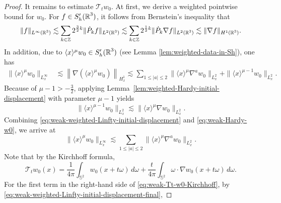 \documentclass[11pt,twoside]{article}
\def\Z{\mathop{\mathbb Z\kern 0pt}\nolimits}
\def\R{\mathop{\mathbb R\kern 0pt}\nolimits}
\def\f{\frac}
\def\ls{\lesssim}
\newcommand{\w}[1]{\langle {#1} \rangle}
\newcommand{\pk}{\dot{P}_k}
\theoremstyle{plain}
\theoremstyle{definition}
\theoremstyle{assumption}
\numberwithin{equation}{section}
\begin{document}
\begin{proof}
				It remains to estimate \(\mathcal T_t w_0\). At first, we derive a weighted pointwise
				bound for $w_0$. For $f\in S'_h(\R^3)$, it follows from Bernstein's inequality that
				\begin{equation}\label{ineq:homogeneous-Sobolev-inequality}
					\|f\|_{L^\infty(\R^3)}
					\ls
					\sum_{k\in\Z}2^{\f32 k}\|\pk f\|_{L^2(\R^3)}
					\ls
					\sum_{k\in\Z}2^{\f12 k}\|\pk\nabla f\|_{L^2(\R^3)}
					\ls
					\|\nabla f\|_{H^{1}(\R^3)}.
				\end{equation}
				In addition, due to $\w{x}^{\mu} w_0 \in S'_h(\R^3)$ (see Lemma \ref{lem:weighted-data-in-Sh}),
                one has
				\begin{equation}
					\label{eq:weak-weighted-Linfty-initial-displacement}
					\begin{aligned}
						\|\langle x\rangle^\mu w_0\|_{L^\infty_x}
						&\lesssim
						\left\|
						\nabla\left(\langle x\rangle^\mu w_0\right)
						\right\|_{H^1_x}
						\ls
						\sum_{1\le |a|\le2}
						\|\langle x\rangle^\mu\nabla^a w_0\|_{L^2_x}
						+
						\|\langle x\rangle^{\mu-1}w_0\|_{L^2_x}.
					\end{aligned}
				\end{equation}
				Because of $\mu-1>-\frac32$,
				applying Lemma~\ref{lem:weighted-Hardy-initial-displacement}
				with parameter \(\mu-1\) yields
				\begin{equation}
					\label{eq:weak-Hardy-w0}
					\|\langle x\rangle^{\mu-1}w_0\|_{L^2_x}
					\ls
					\|\langle x\rangle^\mu\nabla w_0\|_{L^2_x}.
				\end{equation}
				Combining \eqref{eq:weak-weighted-Linfty-initial-displacement} and
				\eqref{eq:weak-Hardy-w0}, we arrive at
				\begin{equation}\label{eq:weak-weighted-Linfty-initial-displacement-final}
					\|\langle x\rangle^\mu w_0\|_{L^\infty_x}
					\ls
					\sum_{1\le |a|\le2}
					\|\langle x\rangle^\mu\nabla^a w_0\|_{L^2_x}.
				\end{equation}
				Note that by the Kirchhoff formula,
				\begin{equation}
					\label{eq:weak-Tt-w0-Kirchhoff}
					\mathcal T_t w_0(x)
					=
					\frac1{4\pi}
					\int_{\mathbb S^2}w_0(x+t\omega)\,d\omega
					+
					\frac{t}{4\pi}
					\int_{\mathbb S^2}\omega\cdot\nabla w_0(x+t\omega)\,d\omega.
				\end{equation}
				For the first term in the right-hand side of
				\eqref{eq:weak-Tt-w0-Kirchhoff}, by
				\eqref{eq:weak-weighted-Linfty-initial-displacement-final},

\end{proof}
\end{document}
